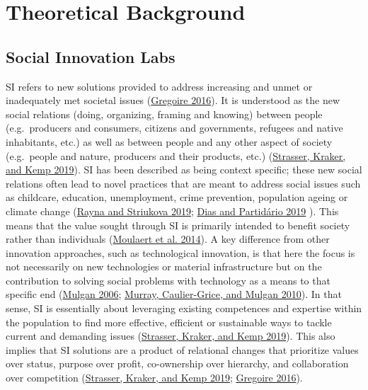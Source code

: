 \documentclass[AMA,STIX1COL,APA,STIX2COL]{WileyNJD-v2}
\begin{document}
\hypertarget{theoretical-background}{%
\section{Theoretical Background}\label{theoretical-background}}

\hypertarget{social-innovation-labs}{%
\subsection{Social Innovation Labs}\label{social-innovation-labs}}

SI refers to new solutions provided to address increasing and unmet or
inadequately met societal issues
(\protect\hyperlink{ref-Gregoire2016}{Gregoire 2016}). It is understood
as the new social relations (doing, organizing, framing and knowing)
between people (e.g.~producers and consumers, citizens and governments,
refugees and native inhabitants, etc.) as well as between people and any
other aspect of society (e.g.~people and nature, producers and their
products, etc.) (\protect\hyperlink{ref-Strasser2019}{Strasser, Kraker,
and Kemp 2019}). SI has been described as being context specific; these
new social relations often lead to novel practices that are meant to
address social issues such as childcare, education, unemployment, crime
prevention, population ageing or climate change
(\protect\hyperlink{ref-Rayna2019}{Rayna and Striukova 2019};
\protect\hyperlink{ref-Dias2019}{Dias and Partidário 2019} ). This means
that the value sought through SI is primarily intended to benefit
society rather than individuals
(\protect\hyperlink{ref-Moulaert2014}{Moulaert et al. 2014}). A key
difference from other innovation approaches, such as technological
innovation, is that here the focus is not necessarily on new
technologies or material infrastructure but on the contribution to
solving social problems with technology as a means to that specific end
(\protect\hyperlink{ref-Mulgan2006}{Mulgan 2006};
\protect\hyperlink{ref-Murray2010}{Murray, Caulier-Grice, and Mulgan
2010}). In that sense, SI is essentially about leveraging existing
competences and expertise within the population to find more effective,
efficient or sustainable ways to tackle current and demanding issues
(\protect\hyperlink{ref-Strasser2019}{Strasser, Kraker, and Kemp 2019}).
This also implies that SI solutions are a product of relational changes
that prioritize values over status, purpose over profit, co-ownership
over hierarchy, and collaboration over competition
(\protect\hyperlink{ref-Strasser2019}{Strasser, Kraker, and Kemp 2019};
\protect\hyperlink{ref-Gregoire2016}{Gregoire 2016}).
\end{document}
